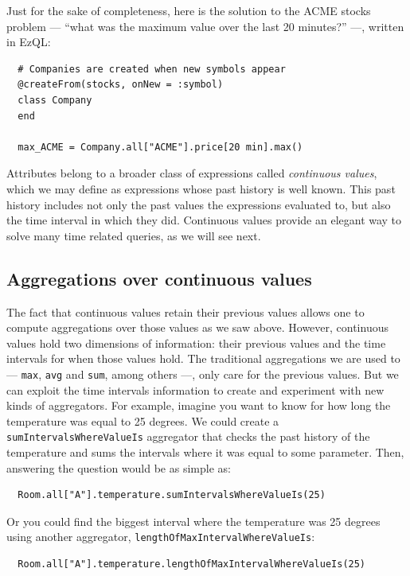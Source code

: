 \documentclass[a4,11pt]{report}
\begin{document}
Just for the sake of completeness, here is the solution to the ACME
stocks problem --- ``what was the maximum value over the last 20
minutes?'' ---, written in EzQL:

\begin{lstlisting}
  # Companies are created when new symbols appear
  @createFrom(stocks, onNew = :symbol)
  class Company
  end

  max_ACME = Company.all["ACME"].price[20 min].max()
\end{lstlisting}

Attributes belong to a broader class of expressions called
\emph{continuous values}, which we may define as expressions whose
past history is well known. This past history includes not only the
past values the expressions evaluated to, but also the time interval
in which they did. Continuous values provide an elegant way to solve
many time related queries, as we will see next.

\subsection{Aggregations over continuous values}

The fact that continuous values retain their previous values allows
one to compute aggregations over those values as we saw
above. However, continuous values hold two dimensions of information:
their previous values and the time intervals for when those values
hold. The traditional aggregations we are used to --- \verb=max=,
\verb=avg= and \verb=sum=, among others ---, only care for the
previous values. But we can exploit the time intervals information to
create and experiment with new kinds of aggregators. For example,
imagine you want to know for how long the temperature was equal to 25
degrees. We could create a \verb=sumIntervalsWhereValueIs= aggregator
that checks the past history of the temperature and sums the intervals
where it was equal to some parameter. Then, answering the question
would be as simple as:

\begin{lstlisting}
  Room.all["A"].temperature.sumIntervalsWhereValueIs(25)
\end{lstlisting}

Or you could find the biggest interval where the temperature was 25
degrees using another aggregator,
\verb=lengthOfMaxIntervalWhereValueIs=:

\begin{lstlisting}
  Room.all["A"].temperature.lengthOfMaxIntervalWhereValueIs(25)
\end{lstlisting}
\end{document}
